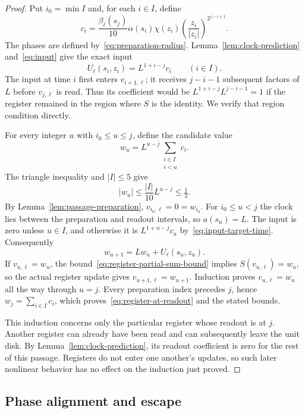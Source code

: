 \begin{proof}
Put $i_0=\min I$ and, for each $i\in I$, define
\[
 c_i=\frac{\beta_\ell(s_j)}{10}\alpha(s_i)\chi(z_i)
      \left(\frac{z_i}{|z_i|}\right)^{2^{j-i+1}}.
\]
The phases are defined by~\eqref{eq:preparation-radius}.
Lemma~\ref{lem:clock-prediction} and~\eqref{eq:input} give the exact input
\begin{equation}\label{eq:input-target-time}
 U_\ell(s_i,z_i)=L^{1+i-j}c_i\qquad(i\in I).
\end{equation}
The input at time $i$ first enters $v_{i+1,\ell}$; it receives $j-i-1$
subsequent factors of $L$ before $v_{j,\ell}$ is read.  Thus its coefficient
would be $L^{1+i-j}L^{j-i-1}=1$ if the register remained in the region
where $S$ is the identity.  We verify that region condition directly.

For every integer $u$ with $i_0\le u\le j$, define the candidate value
\[
 w_u=L^{u-j}\sum_{\substack{i\in I\\i<u}}c_i.
\]
The triangle inequality and $|I|\le5$ give
\begin{equation}\label{eq:register-partial-sum-bound}
 |w_u|\le\frac{|I|}{10}L^{u-j}\le\tfrac12.
\end{equation}
By Lemma~\ref{lem:passage-preparation}, $v_{i_0,\ell}=0=w_{i_0}$.
For $i_0\le u<j$ the clock lies between the preparation and readout
intervals, so $a(s_u)=L$.  The input is zero unless $u\in I$, and otherwise
it is $L^{1+u-j}c_u$ by~\eqref{eq:input-target-time}.  Consequently
\[
 w_{u+1}=Lw_u+U_\ell(s_u,z_u).
\]
If $v_{u,\ell}=w_u$, the bound~\eqref{eq:register-partial-sum-bound} implies
$S(v_{u,\ell})=w_u$, so the actual register update gives
$v_{u+1,\ell}=w_{u+1}$.  Induction proves $v_{u,\ell}=w_u$ all the way through
$u=j$.  Every preparation index precedes $j$, hence $w_j=\sum_{i\in I}c_i$,
which proves~\eqref{eq:register-at-readout} and the stated bounds.

This induction concerns only the particular register whose readout is at
$j$.  Another register can already have been read and can subsequently
leave the unit disk.  By Lemma~\ref{lem:clock-prediction}, its readout
coefficient is zero for the rest of this passage.  Registers do not enter
one another's updates, so such later nonlinear behavior has no effect on
the induction just proved.
\end{proof}

\subsection{Phase alignment and escape}

